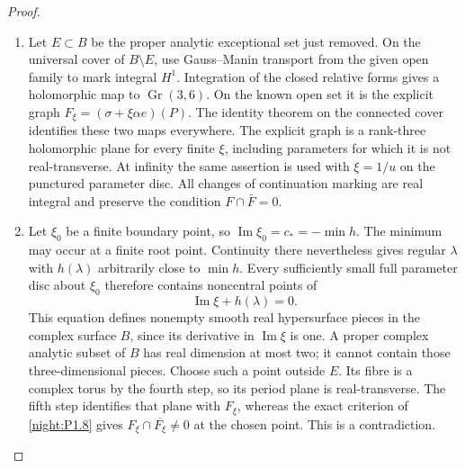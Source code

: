 \begin{proof}
\begin{enumerate}[label=\arabic*.]
Relative exterior differentiation defines an
$\mathcal O_B$-linear map
$\mathcal E\to q_*\Omega^2_{W/B}$.  It vanishes on the known
torus open set.  The target is torsion-free, since it is the
proper direct image of a vector bundle under a submersion.
The identity theorem therefore makes this map zero.  Each
remaining compact connected fibre has three everywhere
independent closed holomorphic one-forms.  Their dual vector
fields commute and are complete by compactness.  Their flows
give a transitive holomorphic $\mathbb C^3$-action: every orbit
is open and the fibre is connected.  Its stabilizer $\Gamma$
is discrete, and compactness of $\mathbb C^3/\Gamma$ makes
$\Gamma$ a full real lattice.  This is the actual complex-torus
structure on each such fibre.

\item Let $E\subset B$ be the proper analytic exceptional set just
removed.  On the universal cover of $B\setminus E$, use
Gauss--Manin transport from the given open family to mark
integral $H^1$.  Integration of the closed relative forms
gives a holomorphic map to $\operatorname{Gr}(3,6)$.  On the
known open set it is the explicit graph
$F_\xi=(\sigma+\xi\alpha e)(P)$.  The identity theorem on the
connected cover identifies these two maps everywhere.
The explicit graph is a rank-three holomorphic plane for
every finite $\xi$, including parameters for which it is not
real-transverse.  At infinity the same assertion is used with
$\xi=1/u$ on the punctured parameter disc.  All changes of
continuation marking are real integral and preserve the
condition $F\cap\bar F=0$.

\item Let $\xi_0$ be a finite boundary point, so
$\operatorname{Im}\xi_0=c_*=-\min h$.
The minimum may occur at a finite root point.  Continuity
there nevertheless gives regular $\lambda$ with $h(\lambda)$
arbitrarily close to $\min h$.  Every sufficiently small full
parameter disc about $\xi_0$ therefore contains noncentral
points of
\[
 \operatorname{Im}\xi+h(\lambda)=0.
\]
This equation defines nonempty smooth real hypersurface
pieces in the complex surface $B$, since its derivative in
$\operatorname{Im}\xi$ is one.  A proper complex analytic
subset of $B$ has real dimension at most two; it cannot
contain those three-dimensional pieces.  Choose such a
point outside $E$.  Its fibre is a complex torus by the fourth
step, so its period plane is real-transverse.  The fifth step
identifies that plane with $F_\xi$, whereas the exact criterion
of \cref{night:P1.8} gives
$F_\xi\cap\overline{F_\xi}\ne0$ at the chosen point.
This is a contradiction.


\end{enumerate}
\end{proof}
